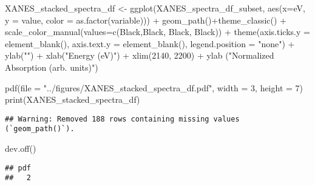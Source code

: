 \documentclass[
]{article}
\newenvironment{Shaded}{\begin{snugshade}}{\end{snugshade}}
\newcommand{\AttributeTok}[1]{\textcolor[rgb]{0.77,0.63,0.00}{#1}}
\newcommand{\DecValTok}[1]{\textcolor[rgb]{0.00,0.00,0.81}{#1}}
\newcommand{\FunctionTok}[1]{\textcolor[rgb]{0.00,0.00,0.00}{#1}}
\newcommand{\NormalTok}[1]{#1}
\newcommand{\OtherTok}[1]{\textcolor[rgb]{0.56,0.35,0.01}{#1}}
\newcommand{\SpecialCharTok}[1]{\textcolor[rgb]{0.00,0.00,0.00}{#1}}
\newcommand{\StringTok}[1]{\textcolor[rgb]{0.31,0.60,0.02}{#1}}
\begin{document}
\begin{Shaded}
\begin{Highlighting}[]
\NormalTok{XANES\_stacked\_spectra\_df }\OtherTok{\textless{}{-}} \FunctionTok{ggplot}\NormalTok{(XANES\_spectra\_df\_subset, }\FunctionTok{aes}\NormalTok{(}\AttributeTok{x=}\NormalTok{eV, }\AttributeTok{y =}\NormalTok{ value, }\AttributeTok{color =} \FunctionTok{as.factor}\NormalTok{(variable))) }\SpecialCharTok{+} \FunctionTok{geom\_path}\NormalTok{()}\SpecialCharTok{+}\FunctionTok{theme\_classic}\NormalTok{() }\SpecialCharTok{+} \FunctionTok{scale\_color\_manual}\NormalTok{(}\AttributeTok{values=}\FunctionTok{c}\NormalTok{(}\StringTok{\textquotesingle{}Black\textquotesingle{}}\NormalTok{,}\StringTok{\textquotesingle{}Black\textquotesingle{}}\NormalTok{, }\StringTok{\textquotesingle{}Black\textquotesingle{}}\NormalTok{, }\StringTok{\textquotesingle{}Black\textquotesingle{}}\NormalTok{)) }\SpecialCharTok{+} \FunctionTok{theme}\NormalTok{(}\AttributeTok{axis.ticks.y =} \FunctionTok{element\_blank}\NormalTok{(),  }\AttributeTok{axis.text.y =} \FunctionTok{element\_blank}\NormalTok{(), }\AttributeTok{legend.position =} \StringTok{"none"}\NormalTok{)  }\SpecialCharTok{+} \FunctionTok{ylab}\NormalTok{(}\StringTok{""}\NormalTok{) }\SpecialCharTok{+} \FunctionTok{xlab}\NormalTok{(}\StringTok{"Energy (eV)"}\NormalTok{) }\SpecialCharTok{+} \FunctionTok{xlim}\NormalTok{(}\DecValTok{2140}\NormalTok{, }\DecValTok{2200}\NormalTok{) }\SpecialCharTok{+} \FunctionTok{ylab}\NormalTok{ (}\StringTok{"Normalized Absorption (arb. units)"}\NormalTok{)}

\FunctionTok{pdf}\NormalTok{(}\AttributeTok{file =} \StringTok{"../figures/XANES\_stacked\_spectra\_df.pdf"}\NormalTok{, }\AttributeTok{width =} \DecValTok{3}\NormalTok{, }\AttributeTok{height =} \DecValTok{7}\NormalTok{) }
\FunctionTok{print}\NormalTok{(XANES\_stacked\_spectra\_df)}
\end{Highlighting}
\end{Shaded}

\begin{verbatim}
## Warning: Removed 188 rows containing missing values (`geom_path()`).
\end{verbatim}

\begin{Shaded}
\begin{Highlighting}[]
\FunctionTok{dev.off}\NormalTok{()}
\end{Highlighting}
\end{Shaded}

\begin{verbatim}
## pdf 
##   2
\end{verbatim}
\end{document}
